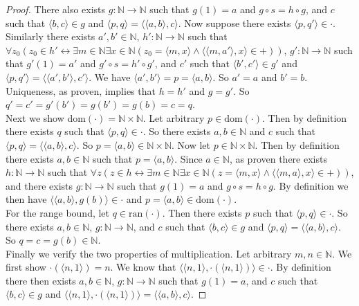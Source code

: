 \documentclass{report}
\begin{document}
\begin{proof}
There also exists $g:\mathbb N\to\mathbb N$ such that $g(1)=a$ and $g\circ s=h\circ g$, and $c$ such that $\langle b,c\rangle\in g$ and $\langle p,q\rangle=\langle\langle a,b\rangle,c\rangle$.
Now suppose there exists $\langle p,q'\rangle\in\cdot$. 
Similarly there exists $a',b'\in\mathbb N$, $h':\mathbb N\to\mathbb N$ such that 
$\forall z_0(z_0\in h'\leftrightarrow\exists m\in\mathbb N\exists x\in\mathbb N(z_0=\langle m,x\rangle\land\langle\langle m,a'\rangle,x\rangle\in+))$, 
$g':\mathbb N\to\mathbb N$ such that $g'(1)=a'$ and $g'\circ s=h'\circ g'$, and $c'$ such that $\langle b',c'\rangle\in g'$ and $\langle p,q'\rangle=\langle\langle a',b'\rangle,c'\rangle$. 
We have $\langle a',b'\rangle=p=\langle a,b\rangle$. So $a'=a$ and $b'=b$. Uniqueness, as proven, implies that $h=h'$ and $g=g'$. So
$q'=c'=g'(b')=g(b')=g(b)=c=q$.\\
\indent Next we show dom$(\cdot)=\mathbb N\times\mathbb N$. Let arbitrary $p\in\text{dom}(\cdot)$.
Then by definition there exists $q$ such that $\langle p,q\rangle\in\cdot$.
So there exists $a,b\in\mathbb N$ and $c$ such that $\langle p,q\rangle=\langle\langle a,b\rangle,c\rangle$.
So $p=\langle a,b\rangle\in\mathbb N\times\mathbb N$. Now let $p\in\mathbb N\times\mathbb N$. Then by definition there exists $a,b\in\mathbb N$ such that $p=\langle a,b\rangle$. Since 
$a\in\mathbb N$, as proven there exists $h:\mathbb N\to\mathbb N$ such that 
$\forall z(z\in h\leftrightarrow\exists m\in\mathbb N\exists x\in\mathbb N(z=\langle m,x\rangle\land\langle\langle m,a\rangle,x\rangle\in+))$, 
and there exists $g:\mathbb N\to\mathbb N$ such that $g(1)=a$ and $g\circ s=h\circ g$.
By definition we then have $\langle\langle a,b\rangle,g(b)\rangle\in\cdot$ and $p=\langle a,b\rangle\in\text{dom}(\cdot)$.\\
\indent For the range bound, let $q\in\text{ran}(\cdot)$. Then there exists $p$ such that $\langle p,q\rangle\in\cdot$. So there exists $a,b\in\mathbb N$, $g:\mathbb N\to\mathbb N$, and $c$ such 
that $\langle b,c\rangle\in g$ and $\langle p,q\rangle=\langle\langle a,b\rangle,c\rangle$.
So $q=c=g(b)\in\mathbb N$.\\
\indent Finally we verify the two properties of multiplication. Let arbitrary $m,n\in\mathbb N$.
We first show $\cdot(\langle n,1\rangle)=n$. We know that $\langle\langle n,1\rangle,\cdot(\langle n,1\rangle)\rangle\in\cdot$.
By definition there then exists $a,b\in\mathbb N$, $g:\mathbb N\to\mathbb N$ such that $g(1)=a$, and $c$ such that $\langle b,c\rangle\in g$ and 
$\langle\langle n,1\rangle,\cdot(\langle n,1\rangle)\rangle=\langle\langle a,b\rangle,c\rangle$.

\end{proof}
\end{document}
